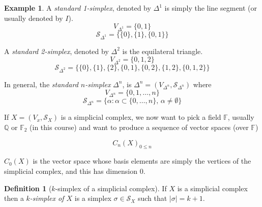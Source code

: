 \documentclass[a4paper,14pt]{extarticle}
\theoremstyle{definition}
\newtheorem*{definition}{Definition}
\newtheorem*{eg}{Example}
\begin{document}
\begin{eg}
	A \emph{standard 1-simplex}, denoted by $\Delta^1$ is simply the line segment (or usually denoted by $I$). 
	\[V_{\Delta^1}=\{0,1\}\] \[\mathcal{S}_{\Delta^1}=\{\{0\},\{1\},\{0,1\}\}\]
	\begin{center}
	\end{center}

\vspace{12pt}

	A \emph{standard 2-simplex}, denoted by $\Delta^2$ is the equilateral triangle.
	\[V_{\Delta^2}=\{0,1,2\}\] \[\mathcal{S}_{\Delta^2}=\{\{0\},\{1\},\{2\},\{0,1\},\{0,2\},\{1,2\},\{0,1,2\}\}\]
	\begin{center}
	\end{center}

	In general, the \emph{standard $n$-simplex} $\Delta^n$, is $\Delta^n=(V_{\Delta^n},\mathcal{S}_{\Delta^n})$ where
	\[V_{\Delta^n}=\{0,1,\ldots,n\}\] \[\mathcal{S}_{\Delta^n}=\{\alpha:\alpha\subset\{0,\ldots,n\}, \,\alpha\neq\emptyset\}\]
\end{eg}

\vspace{12pt}

\noindent If $X=(V_x,\mathcal{S}_X)$ is a simplicial complex, we now want to pick a field $\mathbb{F}$, usually $\mathbb{Q}$ or $\mathbb{F}_2$ (in this course) and want to produce a sequence of vector 
spaces (over $\mathbb{F}$)

\[C_n(X)_{0\leq n}\]

$C_0(X)$ is the vector space whose basis elements are simply the vertices of the simplicial complex, and this has dimension 0.

\begin{definition}[$k$-simplex of a simplicial complex]
	If $X$ is a simplicial complex then a \emph{$k$-simplex of $X$} is a simplex $\sigma\in\mathcal{S}_X$ such that $|\sigma|=k+1$.
\end{definition}
\end{document}
